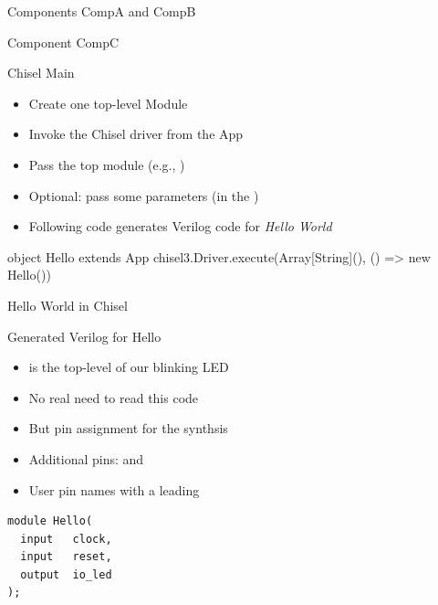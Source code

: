 \begin{frame}[fragile]{Components CompA and CompB}
\end{frame}

\begin{frame}[fragile]{Component CompC}
\end{frame}









\begin{frame}[fragile]{Chisel Main}

\begin{itemize}
\item Create one top-level Module
\item Invoke the Chisel driver from the App
\item Pass the top module (e.g., )
\item Optional: pass some parameters (in the )
\item Following code generates Verilog code for \emph{Hello World}
\end{itemize}
\begin{chisel}
object Hello extends App {
  chisel3.Driver.execute(Array[String](), () => new Hello())
}
\end{chisel}
\end{frame}

\begin{frame}[fragile]{Hello World in Chisel}
\end{frame}



\begin{frame}[fragile]{Generated Verilog for Hello}
\begin{itemize}
\item {} is the top-level of our blinking LED
\item No real need to read this code
\item But pin assignment for the synthsis
\item Additional pins:  and 
\item User pin names with a leading 
\end{itemize}
\begin{verbatim}
module Hello(
  input   clock,
  input   reset,
  output  io_led
);
\end{verbatim}
\end{frame}


